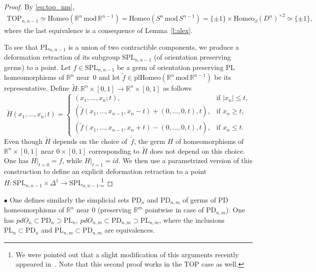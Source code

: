 \documentclass[11pt]{amsart}
\theoremstyle{definition}
\newcommand{\R}{{\mathbb R}}
\newcommand{\Homeo}{\mathrm{Homeo}}
\newcommand{\plHomeo}{\mathrm{plHomeo}}
\newcommand{\PL}{\mathrm{PL}}
\newcommand{\TOP}{\mathrm{TOP}}
\newcommand{\PD}{\mathrm{PD}}
\newcommand{\mmod}{\,\mathrm{mod}\,}
\numberwithin{equation}{section}
\begin{document}
\begin{proof}
By \eqref{eq:top_nm},
\begin{multline*}
\TOP_{n,n-1}\simeq \Homeo(\R^n\mmod\R^{n-1})=\Homeo(S^n\mmod S^{n-1})=\{\pm 1\}\times\Homeo_\partial(D^n)^{\times 2}\simeq\{\pm 1\},
\end{multline*}
where the last equivalence is a consequence of Lemma~\ref{l:alex}.

To see that $\PL_{n,n-1}$ is a union of two contractible components, we produce a deformation retraction of its subgroup $\mathrm{SPL}_{n,n-1}$ (of  orientation preserving  germs) to a point. Let $f\in \mathrm{SPL}_{n,n-1}$ be a germ of orientation preserving PL homeomorphisms
of $\R^n$ near~$0$ and let $\tilde f\in\plHomeo(\R^n\mmod \R^{n-1})$ be its representative. Define $\tilde H\colon \R^n\times [0,1]\to \R^n\times [0,1]$ as 
follows
\[
\tilde H(x_1,\ldots,x_n;t)=
\begin{cases}
(x_1,\ldots,x_n;t),& \text{if $|x_n|\leq t$,}\\
(\tilde f(x_1,\ldots,x_{n-1},x_n-t)+(0,\ldots,0,t),t),&\text{if $x_n\geq t$,}\\
(\tilde f(x_1,\ldots,x_{n-1},x_n+t)-(0,\ldots,0,t),t),&\text{if $x_n\leq t$.}
\end{cases}
\]
Even though $\tilde H$ depends on the choice of~$\tilde f$, 
 the  germ $H$ of homeomorphisms of $\R^n\times[0,1]$ near $0\times [0,1]$ corresponding to $\tilde H$ does not depend on this choice. One has $H|_{t=0}= f$, while $H|_{t=1}=id$. 
 We then use a parametrized version of this construction to define an explicit deformation retraction to a point $H\colon \mathrm{SPL}_{n,n-1}\times\Delta^1\to \mathrm{SPL}_{n,n-1}$.\footnote{We were pointed out
that a slight modification of this arguments recently appeared in~\cite[Lemma~8.17]{KraKupDisc}. Note that this second proof works in the TOP case as well.}
\end{proof}



$\bullet$ One defines similarly the simplicial sets $\PD_n$ and $\PD_{n,m}$ of germs of PD homeomorphisms of $\R^n$ near 0 (preserving $\R^m$ pointwise
in case of $\PD_{n,m}$).  One has $pdO_n\subset \PD_n\supset \PL_n$, $pdO_{n,m}
\subset \PD_{n,m} \supset\PL_{n,m}$, where the inclusions $\PL_n\subset\PD_n$ and $\PL_{n,m}\subset\PD_{n,m}$ are equivalences.
\end{document}
